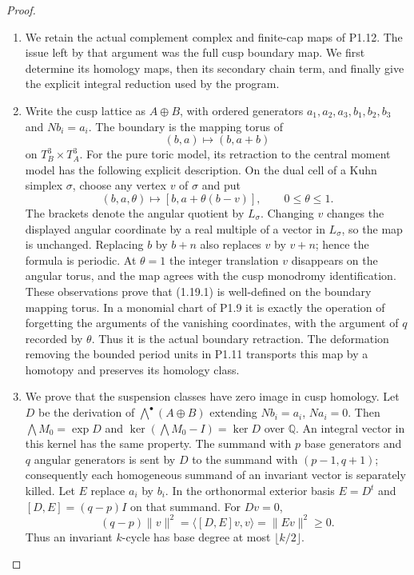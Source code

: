 \documentclass[11pt,a4paper]{article}
\theoremstyle{definition}
\begin{document}
\begin{proof}
\begin{enumerate}[label=\arabic*.]
\item We retain the actual complement complex and finite-cap maps of P1.12.
The issue left by that argument was the full cusp boundary map.
We first determine its homology maps, then its secondary chain term,
and finally give the explicit integral reduction used by the program.

\item Write the cusp lattice as $A\oplus B$, with ordered generators
$a_1,a_2,a_3,b_1,b_2,b_3$ and $Nb_i=a_i$.
The boundary is the mapping torus of
\[
 (b,a)\longmapsto(b,a+b)
\]
on $T_B^3\times T_A^3$.
For the pure toric model, its retraction to the central moment model
has the following explicit description.  On the dual cell of a Kuhn
simplex $\sigma$, choose any vertex $v$ of $\sigma$ and put
\[
 (b,a,\theta)\longmapsto
   [b,a+\theta(b-v)],\qquad0\leq\theta\leq1.
\tag{1.19.1}
\]
The brackets denote the angular quotient by $L_\sigma$.
Changing $v$ changes the displayed angular coordinate by a real
multiple of a vector in $L_\sigma$, so the map is unchanged.
Replacing $b$ by $b+n$ also replaces $v$ by $v+n$; hence the formula
is periodic.  At $\theta=1$ the integer translation $v$ disappears
on the angular torus, and the map agrees with the cusp monodromy
identification.  These observations prove that (1.19.1) is well-defined
on the boundary mapping torus.  In a monomial chart of P1.9 it is
exactly the operation of forgetting the arguments of the vanishing
coordinates, with the argument of $q$ recorded by $\theta$.
Thus it is the actual boundary retraction.  The deformation removing
the bounded period units in P1.11 transports this map by a homotopy
and preserves its homology class.

\item We prove that the suspension classes have zero image in cusp homology.
Let $D$ be the derivation of $\bigwedge^\bullet(A\oplus B)$ extending
$Nb_i=a_i$, $Na_i=0$.  Then $\bigwedge M_0=\exp D$ and
$\ker(\bigwedge M_0-I)=\ker D$ over $\mathbb Q$.
An integral vector in this kernel has the same property.
The summand with $p$ base generators and $q$ angular generators is
sent by $D$ to the summand with $(p-1,q+1)$; consequently each
homogeneous summand of an invariant vector is separately killed.
Let $E$ replace $a_i$ by $b_i$. In the orthonormal exterior basis
$E=D^t$ and $[D,E]=(q-p)I$ on that summand.  For $Dv=0$,
\[
 (q-p)\|v\|^2
 =\langle[D,E]v,v\rangle=\|Ev\|^2\geq0.
\]
Thus an invariant $k$-cycle has base degree at most $\lfloor k/2\rfloor$.


\end{enumerate}
\end{proof}
\end{document}
